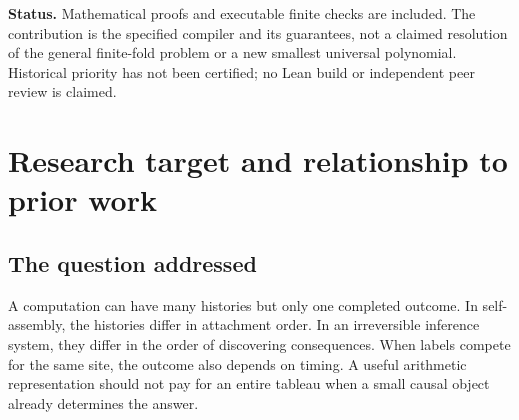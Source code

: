 \documentclass[11pt,letterpaper]{article}
\theoremstyle{definition}
\theoremstyle{remark}
\begin{document}
\begin{abstract}
We construct an explicit, history-free Diophantine semantics for finite
irreversible systems in which each site acquires at most one of several
competing labels. A rule becomes available after all its typed prerequisites
have appeared; its positive integer delay determines its completion time.
The earliest completion fills the site, with a fixed label order resolving
ties. Cycles, incompatible prerequisites, and sites that never activate are
allowed.

For every fixed rule catalogue we emit one polynomial, nonnegative on the
entire real nonnegative orthant and of total degree at most two, whose
natural-number zero is unique for every assignment of the delay parameters.
That zero records the complete outcome, including permanent nonactivation
within the finite system. The number of witnesses is
\[
 m(2q+3)+3D+3(L+R_0)+R,
\]
where $m$ counts nonseed sites, $q$ labels, $D$ distinct nonseed prerequisite
literals, $L$ prerequisite incidences, $R_0$ empty-body rules, and $R$ all
rules. Delays are parameters, not time-unrolling bounds. A single-label
specialization uses only $m+3(L+R_0)+R$ witnesses.

We prove causal uniqueness, exact allocation and height bounds, a finite
polyhedral timing decomposition, and an exponential lower bound on explicit
outcome-region lists. A four-tile counterexample shows that directedness does
not justify replacing exclusive occupancy by independent typed facts.
Applications cover seeded singleton-tile assembly, irreversible threshold
growth, and finite groundings of Turing-complete Horn programs. The
unbounded boundary is identified precisely: positive finite certificates
persist, whereas universal permanent absence cannot have an existential
Diophantine definition.
\end{abstract}

{\noindent\small\textbf{Status.} Mathematical proofs and executable finite checks are
included. The contribution is the specified compiler and its guarantees,
not a claimed resolution of the general finite-fold problem or a new
smallest universal polynomial. Historical priority has not been certified;
no Lean build or independent peer review is claimed.\par}
\section{Research target and relationship to prior work}\label{qoc:ts:sec:intro}
\subsection{The question addressed}
A computation can have many histories but only one completed outcome. In
self-assembly, the histories differ in attachment order. In an irreversible
inference system, they differ in the order of discovering consequences.
When labels compete for the same site, the outcome also depends on timing.
A useful arithmetic representation should not pay for an entire tableau
when a small causal object already determines the answer.
\end{document}
